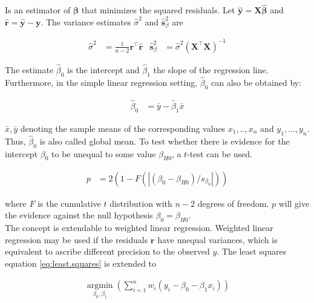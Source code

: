 Is an estimator of $\mathbf{\beta}$ that minimizes the squared residuals. Let $\hat{\mathbf{y}} = \mathbf{X}\hat{\mathbf{\beta}}$ and $\hat{\mathbf{r}} = \hat{\mathbf{y}} - \mathbf{y}$. The variance estimates $\hat{\sigma}^2$ and $\hat{\mathbf{s}}_\beta^2$ are

\begin{align}
\hat{\sigma}^2 &= \frac{1}{n-2}\mathbf{r}^\top \hat{\mathbf{r}} & \hat{\mathbf{s}}_\beta^2 &= \hat{\sigma}^2 (\mathbf{X}^\top \mathbf{X})^{-1} \label{eq:regression.variances}
\end{align}

The estimate $\hat{\beta}_0$ is the intercept and $\hat{\beta}_1$ the slope of the regression line. Furthermore, in the simple linear regression setting, $\hat{\beta}_0$ can also be obtained by:

\begin{align}
\hat{\beta}_0 &= \bar{y} - \hat{\beta}_1 \bar{x} \nonumber
\end{align}

$\bar{x}, \bar{y}$ denoting the sample means of the corresponding values $x_1, .., x_n$ and $y_1, ..., y_n$. Thus, $\hat{\beta}_0$ is also called global mean.
To test whether there is evidence for the intercept $\beta_0$ to be unequal to some value $\beta_{H0}$, a $t$-test can be used. 

\begin{align}
p &= 2(1-F(|(\beta_0 - \beta_{H0})/s_{\beta_0}|)) \nonumber
\end{align}

where $F$ is the cumulative $t$ distribution with $n-2$ degrees of freedom. $p$ will give the evidence against the null hypothesis $\beta_0 = \beta_{H0}$. \\
The concept is extendable to weighted linear regression. Weighted linear regression may be used if the residuals $\mathbf{r}$ have unequal variances, which is equivalent to ascribe different precision to the observed $y$. The least squares equation \ref{eq:least.squares} is extended to

\begin{align}
\operatorname*{argmin}_{\beta_0, \beta_1}(\sum_{i = 1}^n w_i(y_i - \beta_0 - \beta_1 x_i)) \nonumber
\end{align}

